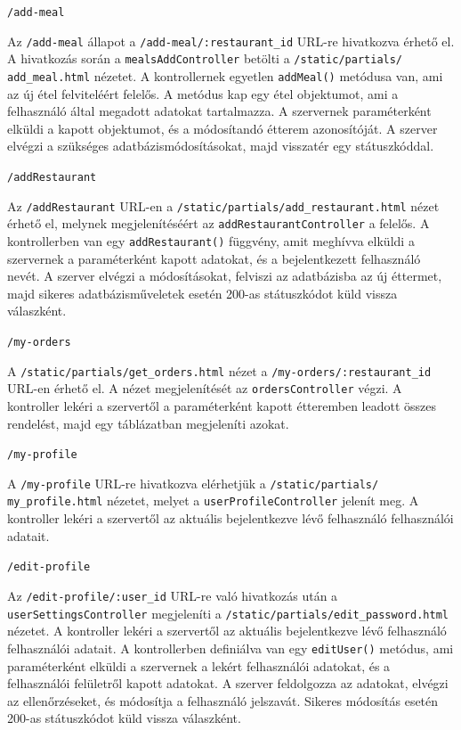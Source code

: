 \bigskip

\noindent \texttt{/add-meal}

Az \texttt{/add-meal} állapot a \texttt{/add-meal/:restaurant\_id} URL-re hivatkozva érhető el. A hivatkozás során a \texttt{mealsAddController} betölti a \texttt{/static/partials/} \\ \texttt{add\_meal.html} nézetet. A kontrollernek egyetlen \texttt{addMeal()} metódusa van, ami az új étel felviteléért felelős. A metódus kap egy étel objektumot, ami a felhasználó által megadott adatokat tartalmazza. A szervernek paraméterként elküldi a kapott objektumot, és a módosítandó étterem azonosítóját. A szerver elvégzi a szükséges adatbázismódosításokat, majd visszatér egy státuszkóddal.

\bigskip

\noindent \texttt{/addRestaurant}

Az \texttt{/addRestaurant} URL-en a \texttt{/static/partials/add\_restaurant.html} nézet érhető el, melynek megjelenítéséért az \texttt{addRestaurantController} a felelős. A kontrollerben van egy \texttt{addRestaurant()} függvény, amit meghívva elküldi a szervernek a paraméterként kapott adatokat, és a bejelentkezett felhasználó nevét. A szerver elvégzi a módosításokat, felviszi az adatbázisba az új éttermet, majd sikeres adatbázisműveletek esetén 200-as státuszkódot küld vissza válaszként.

\bigskip

\noindent \texttt{/my-orders}

A \texttt{/static/partials/get\_orders.html} nézet a \texttt{/my-orders/:restaurant\_id} \\ URL-en érhető el. A nézet megjelenítését az \texttt{ordersController} végzi. A kontroller lekéri a szervertől a paraméterként kapott étteremben leadott összes rendelést, majd egy táblázatban megjeleníti azokat.

\bigskip

\noindent \texttt{/my-profile}

A \texttt{/my-profile} URL-re hivatkozva elérhetjük a \texttt{/static/partials/} \\ \texttt{my\_profile.html} nézetet, melyet a \texttt{userProfileController} jelenít meg. A kontroller lekéri a szervertől az aktuális bejelentkezve lévő felhasználó felhasználói adatait.

\bigskip

\noindent \texttt{/edit-profile}

Az \texttt{/edit-profile/:user\_id} URL-re való hivatkozás után a \texttt{userSettingsCont\-rol\-ler} megjeleníti a \texttt{/static/partials/edit\_password.html} nézetet. A kontroller lekéri a szervertől az aktuális bejelentkezve lévő felhasználó felhasználói adatait. A kontrollerben definiálva van egy \texttt{editUser()} metódus, ami paraméterként elküldi a szervernek a lekért felhasználói adatokat, és a felhasználói felületről kapott adatokat. A szerver feldolgozza az adatokat, elvégzi az ellenőrzéseket, és módosítja a felhasználó jelszavát. Sikeres módosítás esetén 200-as státuszkódot küld vissza válaszként.

